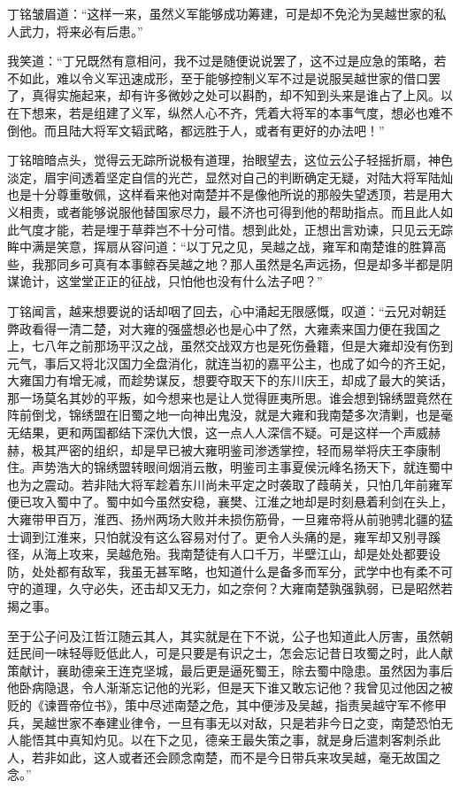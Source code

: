 丁铭皱眉道：“这样一来，虽然义军能够成功筹建，可是却不免沦为吴越世家的私人武力，将来必有后患。”

我笑道：“丁兄既然有意相问，我不过是随便说说罢了，这不过是应急的策略，若不如此，难以令义军迅速成形，至于能够控制义军不过是说服吴越世家的借口罢了，真得实施起来，却有许多微妙之处可以斟酌，却不知到头来是谁占了上风。以在下想来，若是组建了义军，纵然人心不齐，凭着大将军的本事气度，想必也难不倒他。而且陆大将军文韬武略，都远胜于人，或者有更好的办法吧！”

丁铭暗暗点头，觉得云无踪所说极有道理，抬眼望去，这位云公子轻摇折扇，神色淡定，眉宇间透着坚定自信的光芒，显然对自己的判断确定无疑，对陆大将军陆灿也是十分尊重敬佩，这样看来他对南楚并不是像他所说的那般失望透顶，若是用大义相责，或者能够说服他替国家尽力，最不济也可得到他的帮助指点。而且此人如此气度才能，若是埋于草莽岂不十分可惜。想到此处，正想出言劝谏，只见云无踪眸中满是笑意，挥扇从容问道：“以丁兄之见，吴越之战，雍军和南楚谁的胜算高些，我那同乡可真有本事鲸吞吴越之地？那人虽然是名声远扬，但是却多半都是阴谋诡计，这堂堂正正的征战，只怕他也没有什么法子吧？”

丁铭闻言，越来想要说的话却咽了回去，心中涌起无限感慨，叹道：“云兄对朝廷弊政看得一清二楚，对大雍的强盛想必也是心中了然，大雍素来国力便在我国之上，七八年之前那场平汉之战，虽然交战双方也是死伤叠籍，但是大雍却没有伤到元气，事后又将北汉国力全盘消化，就连当初的嘉平公主，也成了如今的齐王妃，大雍国力有增无减，而趁势谋反，想要夺取天下的东川庆王，却成了最大的笑话，那一场莫名其妙的平叛，如今想来也是让人觉得匪夷所思。谁会想到锦绣盟竟然在阵前倒戈，锦绣盟在旧蜀之地一向神出鬼没，就是大雍和我南楚多次清剿，也是毫无结果，更和两国都结下深仇大恨，这一点人人深信不疑。可是这样一个声威赫赫，极其严密的组织，却是早已被大雍明鉴司渗透掌控，轻而易举将庆王李康制住。声势浩大的锦绣盟转眼间烟消云散，明鉴司主事夏侯沅峰名扬天下，就连蜀中也为之震动。若非陆大将军趁着东川尚未平定之时袭取了葭萌关，只怕几年前雍军便已攻入蜀中了。蜀中如今虽然安稳，襄樊、江淮之地却是时刻悬着利剑在头上，大雍带甲百万，淮西、扬州两场大败并未损伤筋骨，一旦雍帝将从前驰骋北疆的猛士调到江淮来，只怕就没有这么容易对付了。更令人头痛的是，雍军却又别寻蹊径，从海上攻来，吴越危殆。我南楚徒有人口千万，半壁江山，却是处处都要设防，处处都有敌军，我虽无甚军略，也知道什么是备多而军分，武学中也有柔不可守的道理，久守必失，还击却又无力，如之奈何？大雍南楚孰强孰弱，已是昭然若揭之事。

至于公子问及江哲江随云其人，其实就是在下不说，公子也知道此人厉害，虽然朝廷民间一味轻辱贬低此人，可是只要是有识之士，怎会忘记昔日攻蜀之时，此人献策献计，襄助德亲王连克坚城，最后更是逼死蜀王，除去蜀中隐患。虽然因为事后他卧病隐退，令人渐渐忘记他的光彩，但是天下谁又敢忘记他？我曾见过他因之被贬的《谏晋帝位书》，策中尽述南楚之危，其中便涉及吴越，指责吴越守军不修甲兵，吴越世家不奉建业律令，一旦有事无以对敌，只是若非今日之变，南楚恐怕无人能悟其中真知灼见。以在下之见，德亲王最失策之事，就是身后遣刺客刺杀此人，若非如此，这人或者还会顾念南楚，而不是今日带兵来攻吴越，毫无故国之念。”


